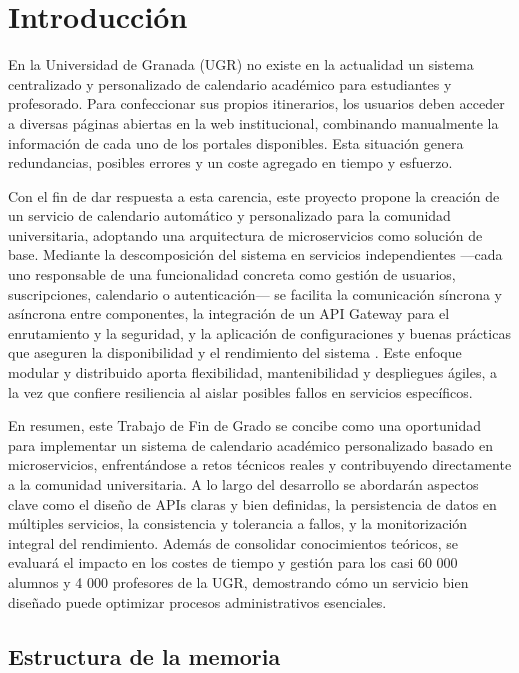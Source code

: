 \chapter{Introducción}\label{cap:introduccion}

En la Universidad de Granada (UGR) no existe en la actualidad un sistema centralizado y personalizado de calendario académico para estudiantes y profesorado. Para confeccionar sus propios itinerarios, los usuarios deben acceder a diversas páginas abiertas en la web institucional, combinando manualmente la información de cada uno de los portales disponibles. Esta situación genera redundancias, posibles errores y un coste agregado en tiempo y esfuerzo.

Con el fin de dar respuesta a esta carencia, este proyecto propone la creación de un servicio de calendario automático y personalizado para la comunidad universitaria, adoptando una arquitectura de microservicios como solución de base. Mediante la descomposición del sistema en servicios independientes —cada uno responsable de una funcionalidad concreta como gestión de usuarios, suscripciones, calendario o autenticación— se facilita la comunicación síncrona y asíncrona entre componentes, la integración de un API Gateway para el enrutamiento y la seguridad, y la aplicación de configuraciones y buenas prácticas que aseguren la disponibilidad y el rendimiento del sistema . Este enfoque modular y distribuido aporta flexibilidad, mantenibilidad y despliegues ágiles, a la vez que confiere resiliencia al aislar posibles fallos en servicios específicos.

En resumen, este Trabajo de Fin de Grado se concibe como una oportunidad para implementar un sistema de calendario académico personalizado basado en microservicios, enfrentándose a retos técnicos reales y contribuyendo directamente a la comunidad universitaria. A lo largo del desarrollo se abordarán aspectos clave como el diseño de APIs claras y bien definidas, la persistencia de datos en múltiples servicios, la consistencia y tolerancia a fallos, y la monitorización integral del rendimiento. Además de consolidar conocimientos teóricos, se evaluará el impacto en los costes de tiempo y gestión para los casi 60 000 alumnos y 4 000 profesores de la UGR, demostrando cómo un servicio bien diseñado puede optimizar procesos administrativos esenciales.

\section{Estructura de la memoria}

